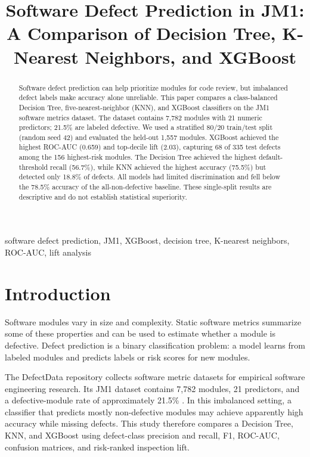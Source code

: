 \documentclass[conference]{IEEEtran}
\title{Software Defect Prediction in JM1: A Comparison of Decision Tree, K-Nearest Neighbors, and XGBoost}
\author{
\IEEEauthorblockN{Aditya Dubey}
}
\begin{document}
\maketitle

\begin{abstract}
Software defect prediction can help prioritize modules for code review, but imbalanced defect labels make accuracy alone unreliable. This paper compares a class-balanced Decision Tree, five-nearest-neighbor (KNN), and XGBoost classifiers on the JM1 software metrics dataset. The dataset contains 7,782 modules with 21 numeric predictors; 21.5\% are labeled defective. We used a stratified 80/20 train/test split (random seed 42) and evaluated the held-out 1,557 modules. XGBoost achieved the highest ROC-AUC (0.659) and top-decile lift (2.03), capturing 68 of 335 test defects among the 156 highest-risk modules. The Decision Tree achieved the highest default-threshold recall (56.7\%), while KNN achieved the highest accuracy (75.5\%) but detected only 18.8\% of defects. All models had limited discrimination and fell below the 78.5\% accuracy of the all-non-defective baseline. These single-split results are descriptive and do not establish statistical superiority.
\end{abstract}

\begin{IEEEkeywords}
software defect prediction, JM1, XGBoost, decision tree, K-nearest neighbors, ROC-AUC, lift analysis
\end{IEEEkeywords}

\section{Introduction}
Software modules vary in size and complexity. Static software metrics summarize some of these properties and can be used to estimate whether a module is defective. Defect prediction is a binary classification problem: a model learns from labeled modules and predicts labels or risk scores for new modules.

The DefectData repository collects software metric datasets for empirical software engineering research. Its JM1 dataset contains 7,782 modules, 21 predictors, and a defective-module rate of approximately 21.5\% \cite{defectdata}. In this imbalanced setting, a classifier that predicts mostly non-defective modules may achieve apparently high accuracy while missing defects. This study therefore compares a Decision Tree, KNN, and XGBoost using defect-class precision and recall, F1, ROC-AUC, confusion matrices, and risk-ranked inspection lift.
\end{document}
